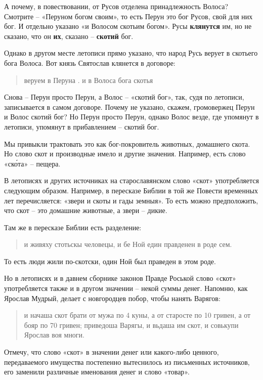 А почему, в повествовании, от Русов отделена принадлежность Волоса? Смотрите – «Перуном богом своим», то есть Перун это бог Русов, свой для них бог. И отдельно указано «и Волосом скотьим богом». Русы \textbf{клянутся} им, но не сказано, что он \textbf{их}, сказано – \textbf{скотий} бог.

Однако в другом месте летописи прямо указано, что народ Русь верует в скотьего бога Волоса. Вот князь Святослав клянется в договоре:

\begin{quotation}
веруем в Перуна . и в Волоса бога скотья
\end{quotation}

Снова – Перун просто Перун, а Волос – «скотий бог», так, судя по летописи, записывается в самом договоре. Почему не указано, скажем, громовержец Перун и Волос скотий бог? Но Перун просто Перун, однако Волос везде, где упомянут в летописи, упомянут в прибавлением – скотий бог.

Мы привыкли трактовать это как бог-покровитель животных, домашнего скота. Но слово скот и производные имело и другие значения. Например, есть слово «ск\'ота» – пещера.

В летописях и других источниках на старославянском слово «скот» употребляется следующим образом. Например, в пересказе Библии в той же Повести временных лет перечисляется: «звери и скоты и гады земныя». То есть можно предположить, что скот – это домашние животные, а звери – дикие.

Там же в пересказе Библии есть разделение:

\begin{quotation}
и живяху стотьскы человецы, и бе Ной един правденен в роде сем.
\end{quotation}

То есть люди жили по-скотски, один Ной был праведен в этом роде.

Но в летописях и в давнем сборнике законов Правде Роськой слово «скот» употребляется также и в другом значении – некой суммы денег. Напомню, как Ярослав Мудрый, делает с новгородцев побор, чтобы нанять Варягов:

\begin{quotation}
и начаша скот брати от мужа по 4 куны,
а от старосте по 10 гривен, а от бояр по 70
гривен; приведоша Варягы, и вьдаша им скот, и совькупи Ярослав воя многи.
\end{quotation}

Отмечу, что слово «скот» в значении денег или какого-либо ценного, передаваемого имущества постепенно вытеснилось из письменных источников, его заменили различные именования денег и слово «товар».

